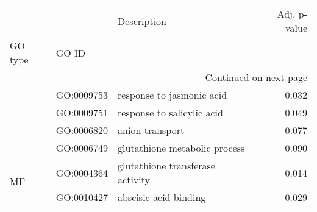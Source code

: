 \begin{longtable}{lllr}
\toprule
   &            &                       Description &  Adj. p-value \\
GO type & GO ID &                                   &               \\
\midrule
\endhead
\midrule
\multicolumn{4}{r}{{Continued on next page}} \\
\midrule
\endfoot

\bottomrule
\endlastfoot
\multirow{4}{*}{BP} & GO:0009753 &         response to jasmonic acid &         0.032 \\
   & GO:0009751 &        response to salicylic acid &         0.049 \\
   & GO:0006820 &                   anion transport &         0.077 \\
   & GO:0006749 &     glutathione metabolic process &         0.090 \\
\cline{1-4}
\multirow{2}{*}{MF} & GO:0004364 &  glutathione transferase activity &         0.014 \\
   & GO:0010427 &             abscisic acid binding &         0.029 \\
\end{longtable}
